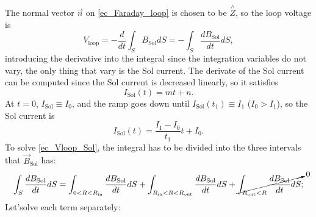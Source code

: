 \documentclass[a4paper,12pt,oneside]{book}
\begin{document}
The normal vector $\vec{n}$ on \eqref{ec_Faraday_loop} is chosen to be $ \stackrel{\wedge}{Z}$, so the loop voltage is
%
\begin{equation}
V_\text{loop} = - \dfrac{d}{dt} \int_S B_\text{Sol} dS= - \int_S \dfrac{d B_\text{Sol}}{dt} dS,
\end{equation}
introducing the derivative into the integral since the integration variables do not vary, the only thing that vary is the Sol current. The derivate of the Sol current can be computed since the Sol current is decreased linearly, so it satisfies
%
\begin{equation}\label{ec_I_sol}
I_\text{Sol}(t)=m t +n.
\end{equation}
At $t=0$, $I_\text{Sol} \equiv I_0$, and the ramp goes down until $I_\text{Sol}(t_1) \equiv  I_1$ ($I_0>I_1$), so the Sol current is
%
\begin{equation}
I_\text{Sol}(t)=\dfrac{I_1-I_0}{t_1} t +I_0.
\end{equation}
To solve \eqref{ec_Vloop_Sol}, the integral has to be divided into the three intervals that $\vec{B}_\text{Sol}$ has:
%
\begin{equation}
\int_S \dfrac{d B_\text{Sol}}{dt} dS=\int_{0<R<R_\text{in}} \dfrac{d B_\text{Sol}}{dt} dS + \int_{R_\text{in}<R<R_\text{out}} \dfrac{d B_\text{Sol}}{dt} dS+ \cancelto{0}{\int_{R_\text{out}<R} \dfrac{d B_\text{Sol}}{dt} dS};
\end{equation}
Let'solve each term separately:
\end{document}
